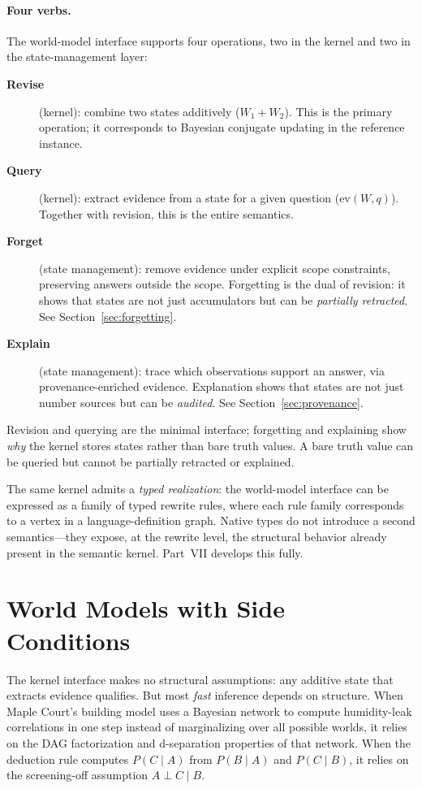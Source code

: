 \documentclass[11pt,openany]{report}
\begin{document}
\paragraph{Four verbs.}
The world-model interface supports four operations, two in the kernel
and two in the state-management layer:
\begin{description}
\item[\textbf{Revise}] (kernel): combine two states additively ($W_1 + W_2$).
  This is the primary operation; it corresponds to Bayesian conjugate
  updating in the reference instance.
\item[\textbf{Query}] (kernel): extract evidence from a state for a given
  question ($\mathrm{ev}(W, q)$).  Together with revision, this is the
  entire semantics.
\item[\textbf{Forget}] (state management): remove evidence under explicit
  scope constraints, preserving answers outside the scope.  Forgetting is
  the dual of revision: it shows that states are not just accumulators but
  can be \emph{partially retracted}.
  See Section~\ref{sec:forgetting}.
\item[\textbf{Explain}] (state management): trace which observations
  support an answer, via provenance-enriched evidence.  Explanation shows
  that states are not just number sources but can be \emph{audited}.
  See Section~\ref{sec:provenance}.
\end{description}

\noindent
Revision and querying are the minimal interface; forgetting and explaining
show \emph{why} the kernel stores states rather than bare truth values.
A bare truth value can be queried but cannot be partially retracted or
explained.

The same kernel admits a \emph{typed realization}: the world-model interface
can be expressed as a family of typed rewrite rules, where each rule family
corresponds to a vertex in a language-definition graph.  Native types
do not introduce a second semantics---they expose, at the rewrite level,
the structural behavior already present in the semantic kernel.
Part~VII develops this fully.

\section{World Models with Side Conditions}

The kernel interface makes no structural assumptions: any additive state
that extracts evidence qualifies.  But most \emph{fast} inference depends
on structure.  When Maple Court's building model uses a Bayesian network
to compute humidity-leak correlations in one step instead of marginalizing
over all possible worlds, it relies on the DAG factorization and
d-separation properties of that network.  When the deduction rule
computes $P(C \mid A)$ from $P(B \mid A)$ and $P(C \mid B)$, it relies
on the screening-off assumption $A \perp C \mid B$.
\end{document}
